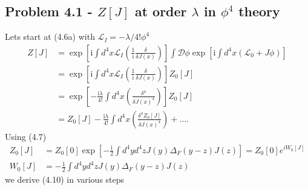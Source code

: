 \documentclass[10pt,a4paper]{book}
\theoremstyle{definition}
\begin{document}
\subsection{Problem 4.1 - \texorpdfstring{$Z[J]$}{Lg} at order \texorpdfstring{$\lambda$}{Lg} in \texorpdfstring{$\phi^4$}{Lg} theory}
Lets start at (4.6a) with $\mathscr{L}_I=-\lambda/4!\phi^4$
\begin{align}
    Z[J]&=\exp\left[\text{i}\int d^4x\mathscr{L}_I\left(\frac{1}{\text{i}}\frac{\delta}{\delta J(x)}\right)\right]\int\mathcal{D}\phi\exp\left[\text{i}\int d^4x(\mathscr{L}_0+J\phi)\right]\\
    &=\exp\left[\text{i}\int d^4x\mathscr{L}_I\left(\frac{1}{\text{i}}\frac{\delta}{\delta J(x)}\right)\right]Z_0[J]\\
    &=\exp\left[-\frac{\text{i}\lambda}{4!}\int d^4x\left(\frac{\delta^4 }{\delta J(x)^4}\right)\right]Z_0[J]\\
    &=Z_0[J]-\frac{\text{i}\lambda}{4!}\int d^4x\left(\frac{\delta^4 Z_0[J]}{\delta J(x)^4}\right)+\dots.
\end{align}
Using (4.7)
\begin{align}
    Z_0[J]&=Z_0[0]\exp\left[-\frac{\text{i}}{2}\int d^4yd^4zJ(y)\Delta_F(y-z)J(z)\right]=Z_0[0]e^{iW_0[J]}\\
    W_0[J]&=-\frac{1}{2}\int d^4yd^4zJ(y)\Delta_F(y-z)J(z)
\end{align}
we derive (4.10) in various steps 
\end{document}
